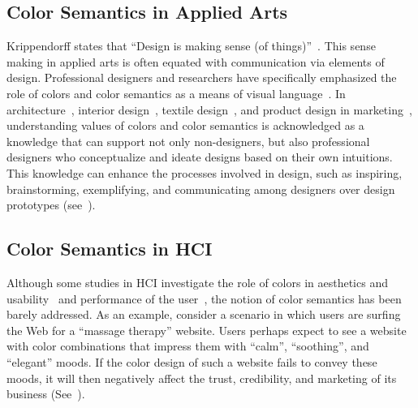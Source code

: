 \documentclass[prodmode,acmtochi]{acmsmall}
\begin{document}
\subsection{Color Semantics in Applied Arts}

Krippendorff states that ``Design is making sense (of things)''~\cite{krippendorff1989essential}. This sense making in applied arts is often equated with communication via elements of design. Professional designers and researchers have specifically emphasized the role of colors and color semantics as a means of visual language~\cite{green2006value,hutchings1995continuity}. In architecture~\cite{hogg1979dimensions,caivano2006research,ural2010architectural}, interior design~\cite{poldma2009learning}, textile design~\cite{lee2006development}, and product design in marketing~\cite{madden2000managing}, understanding values of colors and color semantics is acknowledged as a knowledge that can support not only non-designers, but also professional designers who conceptualize and ideate designs based on their own intuitions. This knowledge can enhance the processes involved in design, such as inspiring, brainstorming, exemplifying, and communicating among designers over design prototypes (see~\cite{poldma2009learning}).

\subsection{Color Semantics in HCI}

Although some studies in HCI investigate the role of colors in aesthetics and usability~\cite{lavie2004assessing,hassenzahl2004interplay,hoffmann2004critical,de2006interaction,schmidt2009webpage,navarre2009icos,moshagen2010facets,lee2010effects,reinecke2011improving,sauer2011influence,reinecke2013predicting,thuring2007usability,lindgaard2007aesthetics,hassenzahl2010inference,lindgaard2011exploration,lee2011impact,yang2012deep} and performance of the user~\cite{moshagen2009blessing,sonderegger2010influence,linSemantically2013}, the notion of color semantics has been barely addressed.
As an example, consider a scenario in which
users are surfing the Web for a ``massage therapy'' website. Users perhaps expect to see
a website with color combinations that impress them with ``calm'', ``soothing'', and ``elegant''
moods. If the color design of such a website fails to convey these moods, it will then negatively affect the trust, credibility, and marketing of its business (See~\cite{lindgaard2011exploration,pengnate2013multimethod}).
\end{document}
